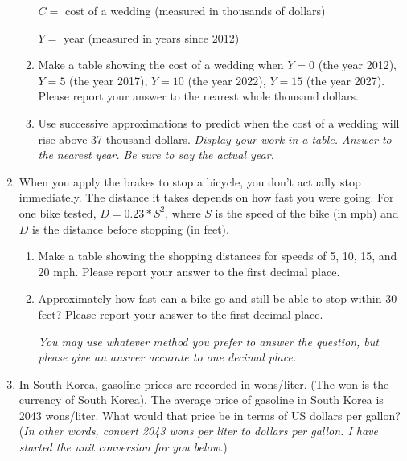\documentclass[12pt]{article}
\begin{document}
\begin{enumerate}
\begin{enumerate}
\quad $C= $ cost of a wedding (measured in thousands of dollars)

\quad $Y = $ year (measured in years since 2012)

\vfill
\item Make a table showing the cost of a wedding when $Y=0$ (the year 2012),  $Y=5$ (the year 2017),  $Y=10$ (the year 2022),  $Y=15$ (the year 2027). Please report your answer to the nearest whole thousand dollars.
\vfill
\item Use successive approximations to predict when the cost of a wedding will rise above 37 thousand dollars.   \emph{Display your work in a table.  Answer to the nearest year.  Be sure to say the actual year.}
\vfill

\end{enumerate}


\newpage
\item When you apply the brakes to stop a bicycle, you don't actually stop immediately.  The distance it takes depends on how fast you were going.  For one bike tested, $D = 0.23 * S^2$, where $S$ is the speed of the bike (in mph) and $D$ is the distance before stopping (in feet).

\begin{enumerate}
\item Make a table showing the shopping distances for speeds of 5, 10, 15, and 20 mph.  Please report your answer to the first decimal place.
\vfill
\item Approximately how fast can a bike go and still be able to stop within 30 feet?  Please report your answer to the first decimal place.

\emph{You may use whatever method you prefer to answer the question, but please give an answer accurate to one decimal place.}
\vfill

\end{enumerate}



\noindent \hrulefill
\item In South Korea, gasoline prices are recorded in wons/liter.  (The won is the currency of South Korea).  The average price of gasoline in South Korea is 2043 wons/liter.  What would that price be in terms of US dollars per gallon? (\emph{In other words, convert 2043 wons per liter to dollars per gallon.  I have started the unit conversion for you below.})



\end{enumerate}
\end{document}
